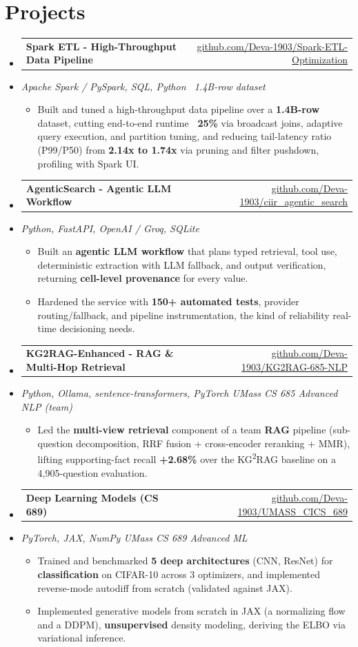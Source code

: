 \documentclass[letterpaper,10pt]{article}
\makeatletter
\newcommand{\resumeItem}[1]{
  \item\small{#1\vspace{-1pt}}
}
\newcommand{\resumeProjectHeading}[2]{
    \item
    \begin{tabular*}{0.985\textwidth}[t]{l@{\extracolsep{\fill}}r}
      \small\textbf{#1} & \small #2 \\
    \end{tabular*}\vspace{-5pt}
}
\newcommand{\resumeProjectSubheading}[1]{
  \vspace{-2pt}\item[] {\small\textcolor{ResumeSlate}{\emph{#1}}}\vspace{-3pt}
}
\newcommand{\resumeSubHeadingListStart}{\begin{itemize}[leftmargin=0.0in, label={}, itemsep=2pt, topsep=2pt]}
\newcommand{\resumeSubHeadingListEnd}{\end{itemize}}
\newcommand{\resumeItemListStart}{\begin{itemize}[leftmargin=0.18in, itemsep=2pt, topsep=1pt]}
\newcommand{\resumeItemListEnd}{\end{itemize}\vspace{-4pt}}
\makeatother
\begin{document}
\section{Projects}
\resumeSubHeadingListStart
  \resumeProjectHeading
    {Spark ETL - High-Throughput Data Pipeline}
    {\href{https://github.com/Deva-1903/Spark-ETL-Optimization}{github.com/Deva-1903/Spark-ETL-Optimization}}
  \resumeProjectSubheading{Apache Spark / PySpark, SQL, Python \enspace\textbar\enspace ~1.4B-row dataset}
    \resumeItemListStart
      \resumeItem{Built and tuned a high-throughput data pipeline over a \textbf{1.4B-row} dataset, cutting end-to-end runtime \textbf{~25\%} via broadcast joins, adaptive query execution, and partition tuning, and reducing tail-latency ratio (P99/P50) from \textbf{2.14x to 1.74x} via pruning and filter pushdown, profiling with Spark UI.}
    \resumeItemListEnd
  \resumeProjectHeading
    {AgenticSearch - Agentic LLM Workflow}
    {\href{https://github.com/Deva-1903/ciir_agentic_search}{github.com/Deva-1903/ciir\_agentic\_search}}
  \resumeProjectSubheading{Python, FastAPI, OpenAI / Groq, SQLite}
    \resumeItemListStart
      \resumeItem{Built an \textbf{agentic LLM workflow} that plans typed retrieval, tool use, deterministic extraction with LLM fallback, and output verification, returning \textbf{cell-level provenance} for every value.}
      \resumeItem{Hardened the service with \textbf{150+ automated tests}, provider routing/fallback, and pipeline instrumentation, the kind of reliability real-time decisioning needs.}
    \resumeItemListEnd
  \resumeProjectHeading
    {KG2RAG-Enhanced - RAG \& Multi-Hop Retrieval}
    {\href{https://github.com/Deva-1903/KG2RAG-685-NLP}{github.com/Deva-1903/KG2RAG-685-NLP}}
  \resumeProjectSubheading{Python, Ollama, sentence-transformers, PyTorch \enspace\textbar\enspace UMass CS 685 Advanced NLP (team)}
    \resumeItemListStart
      \resumeItem{Led the \textbf{multi-view retrieval} component of a team \textbf{RAG} pipeline (sub-question decomposition, RRF fusion + cross-encoder reranking + MMR), lifting supporting-fact recall \textbf{+2.68\%} over the KG\textsuperscript{2}RAG baseline on a 4,905-question evaluation.}
    \resumeItemListEnd
  \resumeProjectHeading
    {Deep Learning Models (CS 689)}
    {\href{https://github.com/Deva-1903/UMASS_CICS_689}{github.com/Deva-1903/UMASS\_CICS\_689}}
  \resumeProjectSubheading{PyTorch, JAX, NumPy \enspace\textbar\enspace UMass CS 689 Advanced ML}
    \resumeItemListStart
      \resumeItem{Trained and benchmarked \textbf{5 deep architectures} (CNN, ResNet) for \textbf{classification} on CIFAR-10 across 3 optimizers, and implemented reverse-mode autodiff from scratch (validated against JAX).}
      \resumeItem{Implemented generative models from scratch in JAX (a normalizing flow and a DDPM), \textbf{unsupervised} density modeling, deriving the ELBO via variational inference.}
    \resumeItemListEnd
\resumeSubHeadingListEnd
\vspace{-4pt}
\end{document}
